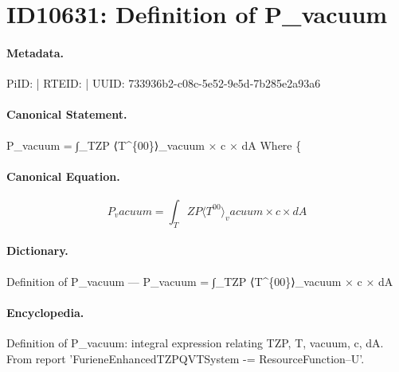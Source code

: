 \section*{ID10631: Definition of P\_vacuum}
\paragraph{Metadata.}
PiID:  | RTEID:  | UUID: 733936b2-c08c-5e52-9e5d-7b285e2a93a6

\paragraph{Canonical Statement.}
P\_vacuum = ∫\_TZP ⟨T\textasciicircum{}\{00\}⟩\_vacuum × c × dA Where \{

\paragraph{Canonical Equation.}
\[
P_vacuum = ∫_TZP ⟨T^{00}⟩_vacuum × c × dA
\]

\paragraph{Dictionary.}
Definition of P\_vacuum — P\_vacuum = ∫\_TZP ⟨T\textasciicircum{}\{00\}⟩\_vacuum × c × dA

\paragraph{Encyclopedia.}
Definition of P\_vacuum: integral expression relating TZP, T, vacuum, c, dA. From report 'FurieneEnhancedTZPQVTSystem -= ResourceFunction--U'.
